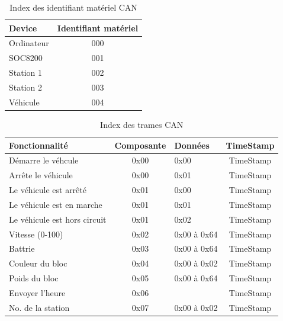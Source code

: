 \documentclass[10pt,a4paper,final]{article}
\begin{document}
\begin{spacing}{1.5}
\begin{table}[!ht]
\caption{Index des identifiant matériel CAN}
\medskip
\centering
\begin{tabular}{|l|c|}
\hline 
\textbf{Device} & \textbf{Identifiant matériel} \\ 
\hline 
Ordinateur & 000 \\ 
\hline 
SOC8200 & 001 \\ 
\hline 
Station 1 & 002 \\ 
\hline 
Station 2  & 003 \\ 
\hline 
Véhicule  & 004 \\ 
\hline 
\end{tabular} 
\label{tab:testtab1}
\end{table} 


\begin{table}[!ht]
\caption{Index des trames CAN}
\medskip
\centering
\begin{tabular}{|l|c|l|c|}
\hline 
\textbf{Fonctionnalité} & \textbf{Composante} & \textbf{Données} & \textbf{TimeStamp}\\
\hline 
Démarre le véhcule & 0x00 & 0x00 & TimeStamp\\ 
\hline 
Arrête le véhicule & 0x00 & 0x01 & TimeStamp\\ 
\hline 
Le véhicule est arrêté & 0x01 & 0x00 & TimeStamp\\ 
\hline 
Le véhicule est en marche& 0x01 & 0x01 & TimeStamp\\ 
\hline 
Le véhicule est hors circuit & 0x01 & 0x02 & TimeStamp\\ 
\hline 
Vitesse (0-100) & 0x02 & 0x00 à 0x64 & TimeStamp\\ 
\hline 
Battrie & 0x03 & 0x00 à 0x64 & TimeStamp\\ 
\hline 
Couleur du bloc & 0x04 & 0x00 à 0x02 & TimeStamp\\ 
\hline 
Poids du bloc & 0x05 & 0x00 à 0x64 & TimeStamp\\ 
\hline 
Envoyer l'heure & 0x06 &   & TimeStamp\\ 
\hline 
No. de la station & 0x07 & 0x00 à 0x02 & TimeStamp\\ 
\hline 
\end{tabular} 
\label{tab:testtab1}
\end{table}


\end{spacing}
\end{document}

